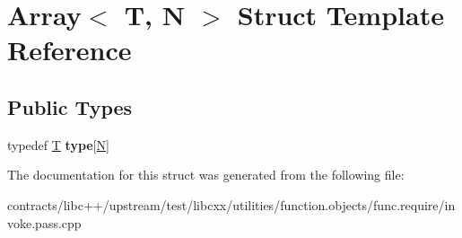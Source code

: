 \hypertarget{struct_array}{}\section{Array$<$ T, N $>$ Struct Template Reference}
\label{struct_array}
\subsection*{Public Types}
\begin{DoxyCompactItemize}
\item 
\mbox{\label{struct_array_a1eeeb70db24a128fcaf81452662589b6}} 
typedef \mbox{\hyperlink{struct_t}{T}} {\bfseries type}\mbox{[}\mbox{\hyperlink{group__types_gaf9c1edb0e0da55ec6ba09f32f6839529}{N}}\mbox{]}
\end{DoxyCompactItemize}


The documentation for this struct was generated from the following file\+:\begin{DoxyCompactItemize}
\item 
contracts/libc++/upstream/test/libcxx/utilities/function.\+objects/func.\+require/invoke.\+pass.\+cpp\end{DoxyCompactItemize}
